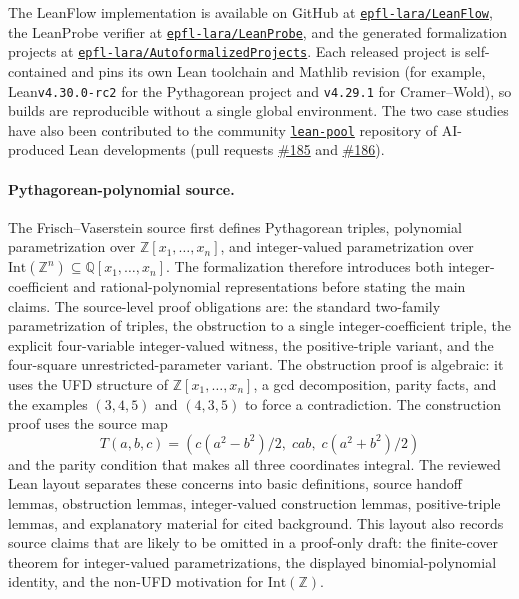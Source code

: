 \documentclass{article}
\newcommand{\method}{LeanFlow\xspace}
\newcommand{\lean}{Lean\xspace}
\newcommand{\mathlib}{Mathlib\xspace}
\begin{document}
The \method implementation is available on GitHub at \href{https://github.com/epfl-lara/LeanFlow}{\texttt{epfl-lara/LeanFlow}}, the LeanProbe verifier at \href{https://github.com/epfl-lara/LeanProbe}{\texttt{epfl-lara/LeanProbe}}, and the generated formalization projects at \href{https://github.com/epfl-lara/AutoformalizedProjects}{\texttt{epfl-lara/AutoformalizedProjects}}.
Each released project is self-contained and pins its own \lean toolchain and \mathlib revision (for example, \lean \texttt{v4.30.0-rc2} for the Pythagorean project and \texttt{v4.29.1} for Cramer--Wold), so builds are reproducible without a single global environment.
The two case studies have also been contributed to the community \href{https://github.com/Vilin97/lean-pool}{\texttt{lean-pool}} repository of AI-produced \lean developments (pull requests \href{https://github.com/Vilin97/lean-pool/pull/185}{\#185} and \href{https://github.com/Vilin97/lean-pool/pull/186}{\#186}).

\paragraph{Pythagorean-polynomial source.} \label{app:docs-case-study}
The Frisch--Vaserstein source first defines Pythagorean triples, polynomial parametrization over $\mathbb{Z}[x_1,\ldots,x_n]$, and integer-valued parametrization over $\mathrm{Int}(\mathbb{Z}^n)\subseteq \mathbb{Q}[x_1,\ldots,x_n]$.
The formalization therefore introduces both integer-coefficient and rational-polynomial representations before stating the main claims.
The source-level proof obligations are: the standard two-family parametrization of triples, the obstruction to a single integer-coefficient triple, the explicit four-variable integer-valued witness, the positive-triple variant, and the four-square unrestricted-parameter variant.
The obstruction proof is algebraic: it uses the UFD structure of $\mathbb{Z}[x_1,\ldots,x_n]$, a gcd decomposition, parity facts, and the examples $(3,4,5)$ and $(4,3,5)$ to force a contradiction.
The construction proof uses the source map
\[
  T(a,b,c)=\left(c(a^2-b^2)/2,\;cab,\;c(a^2+b^2)/2\right)
\]
and the parity condition that makes all three coordinates integral.
The reviewed \lean layout separates these concerns into basic definitions, source handoff lemmas, obstruction lemmas, integer-valued construction lemmas, positive-triple lemmas, and explanatory material for cited background.
This layout also records source claims that are likely to be omitted in a proof-only draft: the finite-cover theorem for integer-valued parametrizations, the displayed binomial-polynomial identity, and the non-UFD motivation for $\mathrm{Int}(\mathbb{Z})$.
\end{document}

